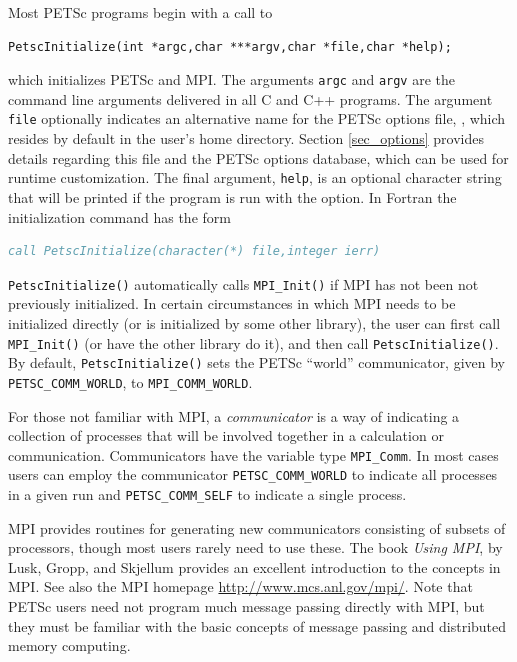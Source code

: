 Most PETSc programs begin with a call to
\begin{lstlisting}
PetscInitialize(int *argc,char ***argv,char *file,char *help);
\end{lstlisting}
which initializes PETSc and MPI.  The arguments \lstinline{argc} and
\lstinline{argv} are the command line arguments delivered in all C and C++
programs.  The argument \lstinline{file}
optionally indicates an alternative name for the PETSc options file,
, which resides by default in the user's home directory.
Section \ref{sec_options} provides details regarding
this file and the PETSc options database, which can be used for runtime
customization. The final argument, \lstinline{help}, is an optional
character string that will be printed if the program is run with the
 option.  In Fortran the initialization command has the form
\begin{lstlisting}[language=fortran]
call PetscInitialize(character(*) file,integer ierr)
\end{lstlisting}
\lstinline{PetscInitialize()} automatically calls \lstinline{MPI_Init()} if MPI
has not been not previously initialized. In certain 
circumstances in which MPI needs to be initialized directly (or is
initialized by some other library), the user can first call
\lstinline{MPI_Init()} (or have the other library do it), and then call
\lstinline{PetscInitialize()}.
By default, \lstinline{PetscInitialize()} sets the PETSc ``world''
communicator, given by \lstinline{PETSC_COMM_WORLD}, to \lstinline{MPI_COMM_WORLD}.

For those not familiar with MPI, a {\em communicator} is a way of
indicating a collection of processes that will be involved together
in a calculation or communication. Communicators have the variable type
\lstinline{MPI_Comm}. In most cases users can employ the communicator
\lstinline{PETSC_COMM_WORLD} to indicate all processes in a given run and
\lstinline{PETSC_COMM_SELF} to indicate a single process.

MPI provides routines
for generating new communicators consisting of subsets of processors,
though most users rarely need to use these. The book {\em Using MPI},
by Lusk, Gropp, and Skjellum \cite{using-mpi} provides an excellent
introduction to the concepts in MPI. See also the MPI homepage
\href{http://www.mcs.anl.gov/mpi/}{http://www.mcs.anl.gov/mpi/}.
Note that PETSc users need not program much message passing directly
with MPI, but they must be familiar with the basic concepts of message
passing and distributed memory computing.

